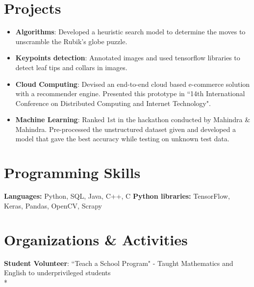 \documentclass[11pt,letter]{article}
\newcommand\tab[1][1cm]{\hspace*{#1}}
\newcommand{\resumeItem}[2]{
  \item\small{
    \textbf{#1}{: #2 \vspace{-2pt}}
  }
}
\newcommand{\ac}[3]{
  \small{
    {#1}\tab{\textbf{#2:} #3 \vspace{-2pt}}
    \\*
  }
}
\newcommand{\ach}[2]{
  \small{
    \textbf{#1}{: #2 \vspace{-2pt}}
    \\*
  }
}
\newcommand{\resumeSubItem}[2]{\resumeItem{#1}{#2}\vspace{-5pt}}
\newcommand{\resumeSubHeadingListStart}{\begin{itemize}[leftmargin=*]}
\newcommand{\resumeSubHeadingListEnd}{\end{itemize}}
\begin{document}
\section{Projects}
  \resumeSubHeadingListStart
    \resumeSubItem{Algorithms}
      {Developed a heuristic search model to determine the moves to unscramble the Rubik's globe puzzle.}
      \resumeSubItem{Keypoints detection}
      {Annotated images and used tensorflow libraries to detect leaf tips and collars in images.}
    \resumeSubItem{Cloud Computing}
      {Devised an end-to-end cloud based e-commerce solution with a recommender engine. Presented this prototype in ``14th International Conference on Distributed Computing and Internet Technology".}
    \resumeSubItem{Machine Learning}{Ranked 1st in the hackathon conducted by Mahindra \& Mahindra. Pre-processed the unstructured dataset given and developed a model that gave the best accuracy while testing on unknown test data.}
  \resumeSubHeadingListEnd

\section{Programming Skills}
     \textbf{Languages: }{Python, SQL, Java, C++, C  }
     \hfill
     \break
     \textbf{Python libraries: }{TensorFlow, Keras, Pandas, OpenCV, Scrapy }
   



\section{Organizations \& Activities}
    \ach
        {Student Volunteer}
        {``Teach a School Program" - Taught Mathematics and English to underprivileged students}
\end{document}
